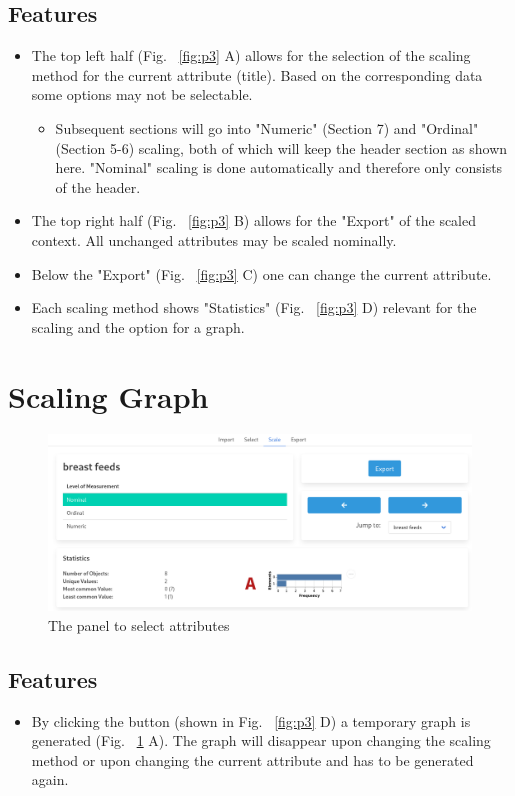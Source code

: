 \documentclass[]{article}
\begin{document}
\subsection{Features}
\begin{itemize}
    \item The top left half (Fig. ~\ref{fig:p3} A) allows for the selection of the scaling method for the current attribute (title). Based on the corresponding data some options may not be selectable.
    \begin{itemize}
        \item Subsequent sections will go into "Numeric" (Section 7) and "Ordinal" (Section 5-6) scaling, both of which will keep the header section as shown here. "Nominal" scaling is done automatically and therefore only consists of the header.
    \end{itemize}
    \item The top right half (Fig. ~\ref{fig:p3} B) allows for the "Export" of the scaled context. All unchanged attributes may be scaled nominally.
    \item Below the "Export" (Fig. ~\ref{fig:p3} C) one can change the current attribute.
    \item Each scaling method shows "Statistics" (Fig. ~\ref{fig:p3} D) relevant for the scaling and the option for a graph.
\end{itemize}

\section{Scaling Graph}
\begin{figure}[H]
	\includegraphics[width=\linewidth]{images/nominal_graph.png}
	\caption{The panel to select attributes}
	\label{fig:p4}
\end{figure}
\subsection{Features}
\begin{itemize}
    \item By clicking the button (shown in Fig. ~\ref{fig:p3} D)  a temporary graph is generated (Fig. ~\ref{fig:p4} A). The graph will disappear upon changing the scaling method or upon changing the current attribute and has to be generated again.
\end{itemize}
\end{document}
